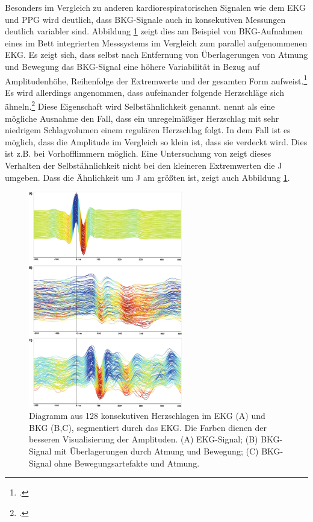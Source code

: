 	
	Besonders im Vergleich zu anderen kardiorespiratorischen Signalen wie dem \ac{EKG} und \ac{PPG} wird deutlich, dass \ac{BKG}-Signale auch in konsekutiven Messungen deutlich variabler sind. Abbildung \ref{fig:variabilitaet} zeigt dies am Beispiel von \ac{BKG}-Aufnahmen eines im Bett integrierten Messsystems im Vergleich zum parallel aufgenommenen \ac{EKG}. Es zeigt sich, dass selbst nach Entfernung von Überlagerungen von Atmung  und Bewegung das \ac{BKG}-Signal eine höhere Variabilität in Bezug auf Amplitudenhöhe, Reihenfolge der Extremwerte und der gesamten Form aufweist.\footcite[Vgl.][]{Zink2017} Es wird allerdings angenommen, dass aufeinander folgende Herzschläge sich ähneln.\footcite[Vgl.][]{Bruser2013} Diese Eigenschaft wird Selbstähnlichkeit genannt. \citeauthor{Bruser2013} nennt als eine mögliche Ausnahme den Fall, dass ein unregelmäßiger Herzschlag mit sehr niedrigem Schlagvolumen einem regulären Herzschlag folgt. In dem Fall ist es möglich, dass die Amplitude im Vergleich so klein ist, dass sie verdeckt wird. Dies ist z.B. bei Vorhofflimmern möglich. Eine Untersuchung von \citeauthor{Rosales2012} zeigt dieses Verhalten der Selbstähnlichkeit nicht bei den kleineren Extremwerten die J umgeben. Dass die Ähnlichkeit um J am größten ist, zeigt auch Abbildung \ref{fig:variabilitaet}.
	
	\begin{figure}[H]
		\centering
		\includegraphics[width=0.6\textwidth]{pic/Variabilitaet.jpg}
		\caption[Visualisierung der Variabilität des \ac{BKG}-Signals]{Diagramm aus 128 konsekutiven Herzschlagen im EKG (A) und BKG (B,C), segmentiert durch das EKG. Die Farben dienen der besseren Visualisierung der Amplituden. (A) EKG-Signal; (B) BKG-Signal mit Überlagerungen durch Atmung und Bewegung; (C) \ac{BKG}-Signal ohne Bewegungsartefakte und Atmung.\protect\footnotemark}
		\label{fig:variabilitaet}
	\end{figure}
	
